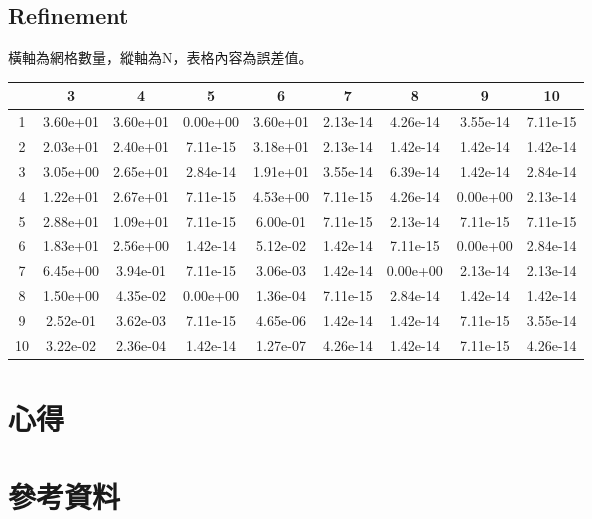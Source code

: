 \documentclass[a4paper,12pt]{article}
\begin{document}
\subsection{Refinement}
橫軸為網格數量，縱軸為N，表格內容為誤差值。
\begin{longtable}{|c|c|c|c|c|c|c|c|c|}
    \hline
    & 3 & 4 & 5 & 6 & 7 & 8 & 9 & 10\\
    \hline
    1 & 3.60e+01 & 3.60e+01 & 0.00e+00 & 3.60e+01 & 2.13e-14 & 4.26e-14 & 3.55e-14 & 7.11e-15 \\
    \hline
    2 & 2.03e+01 & 2.40e+01 & 7.11e-15 & 3.18e+01 & 2.13e-14 & 1.42e-14 & 1.42e-14 & 1.42e-14 \\
    \hline
    3 & 3.05e+00 & 2.65e+01 & 2.84e-14 & 1.91e+01 & 3.55e-14 & 6.39e-14 & 1.42e-14 & 2.84e-14 \\
    \hline
    4 & 1.22e+01 & 2.67e+01 & 7.11e-15 & 4.53e+00 & 7.11e-15 & 4.26e-14 & 0.00e+00 & 2.13e-14 \\
    \hline
    5 & 2.88e+01 & 1.09e+01 & 7.11e-15 & 6.00e-01 & 7.11e-15 & 2.13e-14 & 7.11e-15 & 7.11e-15 \\
    \hline
    6 & 1.83e+01 & 2.56e+00 & 1.42e-14 & 5.12e-02 & 1.42e-14 & 7.11e-15 & 0.00e+00 & 2.84e-14 \\
    \hline
    7 & 6.45e+00 & 3.94e-01 & 7.11e-15 & 3.06e-03 & 1.42e-14 & 0.00e+00 & 2.13e-14 & 2.13e-14 \\
    \hline
    8 & 1.50e+00 & 4.35e-02 & 0.00e+00 & 1.36e-04 & 7.11e-15 & 2.84e-14 & 1.42e-14 & 1.42e-14 \\
    \hline
    9 & 2.52e-01 & 3.62e-03 & 7.11e-15 & 4.65e-06 & 1.42e-14 & 1.42e-14 & 7.11e-15 & 3.55e-14 \\
    \hline
    10 & 3.22e-02 & 2.36e-04 & 1.42e-14 & 1.27e-07 & 4.26e-14 & 1.42e-14 & 7.11e-15 & 4.26e-14 \\
    \hline
      
\end{longtable}


\section{心得}


\section{參考資料}
\end{document}
